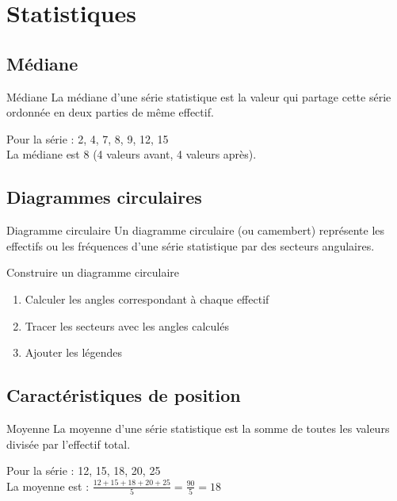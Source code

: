 \chapter{Statistiques}

\section{Médiane}
\begin{definition}{Médiane}
La médiane d'une série statistique est la valeur qui partage cette série ordonnée en deux parties de même effectif.
\end{definition}

\begin{exemple}
Pour la série : 2, 4, 7, 8, 9, 12, 15\\
La médiane est 8 (4 valeurs avant, 4 valeurs après).
\end{exemple}

\section{Diagrammes circulaires}
\begin{definition}{Diagramme circulaire}
Un diagramme circulaire (ou camembert) représente les effectifs ou les fréquences d'une série statistique par des secteurs angulaires.
\end{definition}

\begin{methode}{Construire un diagramme circulaire}
\begin{enumerate}
    \item Calculer les angles correspondant à chaque effectif
    \item Tracer les secteurs avec les angles calculés
    \item Ajouter les légendes
\end{enumerate}
\end{methode}

\section{Caractéristiques de position}
\begin{definition}{Moyenne}
La moyenne d'une série statistique est la somme de toutes les valeurs divisée par l'effectif total.
\end{definition}

\begin{exemple}
Pour la série : 12, 15, 18, 20, 25\\
La moyenne est : $\frac{12 + 15 + 18 + 20 + 25}{5} = \frac{90}{5} = 18$
\end{exemple} 